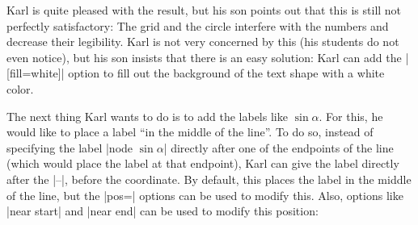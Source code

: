 Karl is quite pleased with the result, but his son points out that this is
still not perfectly satisfactory: The grid and the circle interfere with the
numbers and decrease their legibility. Karl is not very concerned by this (his
students do not even notice), but his son insists that there is an easy
solution: Karl can add the |[fill=white]| option to fill out the background of
the text shape with a white color.

The next thing Karl wants to do is to add the labels like $\sin \alpha$. For
this, he would like to place a label ``in the middle of the line''. To do so,
instead of specifying the label |node {$\sin\alpha$}|  directly after one of
the endpoints of the line (which would place the label at that endpoint), Karl
can give the label directly after the |--|, before the coordinate. By default,
this places the label in the middle of the line, but the |pos=| options can be
used to modify this. Also, options like |near start| and |near end| can be used
to modify this position:
%
\begin{codeexample}[preamble={\usetikzlibrary{intersections}}]
\end{codeexample}


